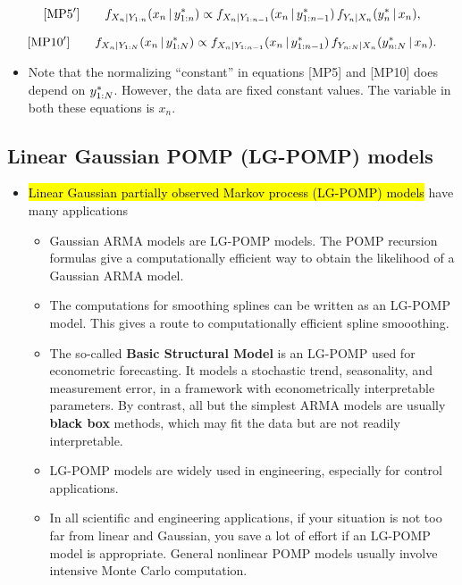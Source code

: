 \documentclass[]{article}
\providecommand{\tightlist}{%
  \setlength{\itemsep}{0pt}\setlength{\parskip}{0pt}}
\begin{document}
$$\text{[MP5\(^\prime\)]}
\quad\quad \displaystyle  f_{X_{n}|Y_{1:n}}(x_{n}{\, | \,} y_{1:n}^*) \propto f_{X_{n}|Y_{1:n-1}}(x_{n}{\, | \,} y_{1:n-1}^*)\, f_{Y_n|X_n}(y_n^*{\, | \,} x_n),$$

$$\text{[MP10\(^\prime\)]}
\quad\quad \displaystyle  f_{X_{n}|Y_{1:N}}(x_n{\, | \,} y_{1:N}^*) \propto f_{X_{n}|Y_{1:n-1}}(x_{n}{\, | \,} y_{1:n-1}^*) \, f_{Y_{n:N}|X_{n}}(y_{n:N}^*{\, | \,} x_n).$$

\begin{itemize}
\tightlist
\item
  Note that the normalizing ``constant'' in equations {[}MP5{]} and
  {[}MP10{]} does depend on \(y_{1:N}^*\). However, the data are
  fixed constant values. The variable in both these equations is
  \(x_n\).
\end{itemize}

\subsection{Linear Gaussian POMP (LG-POMP)
models}\label{linear-gaussian-pomp-lg-pomp-models}

\begin{itemize}
\item
  \hl{Linear Gaussian partially observed Markov process (LG-POMP) models}
  have many applications

  \begin{itemize}
  \item
    Gaussian ARMA models are LG-POMP models. The POMP recursion formulas
    give a computationally efficient way to obtain the likelihood of a
    Gaussian ARMA model.
  \item
    The computations for smoothing splines can be written as an LG-POMP
    model. This gives a route to computationally efficient spline
    smooothing.
  \item
    The so-called \textbf{Basic Structural Model} is an LG-POMP used for
    econometric forecasting. It models a stochastic trend, seasonality,
    and measurement error, in a framework with econometrically
    interpretable parameters. By contrast, all but the simplest ARMA
    models are usually \textbf{black box} methods, which may fit the
    data but are not readily interpretable.
  \item
    LG-POMP models are widely used in engineering, especially for
    control applications.
  \item
    In all scientific and engineering applications, if your situation is
    not too far from linear and Gaussian, you save a lot of effort if an
    LG-POMP model is appropriate. General nonlinear POMP models usually
    involve intensive Monte Carlo computation.
  \end{itemize}
\end{itemize}
\end{document}
